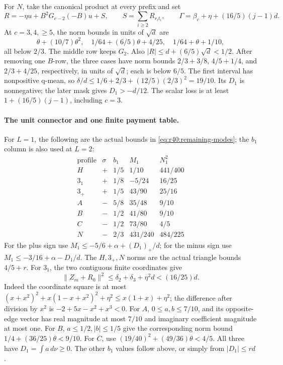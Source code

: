 For \(N\), take the canonical product at every prefix and set
\[
 R=-\eta u+B^2G_{c-2}(-B)u+S,\qquad
 S=\sum_{i\ge2}R_{r_it_i},\qquad
 \Gamma=\beta_c+\eta+(16/5)(j-1)d .
\]
At \(c=3,4,\ge5\), the norm bounds in units of \(\sqrt d\) are
\[
 \theta+(10/7)\theta^2,\quad
 1/64+(6/5)\theta+4/25,\quad
 1/64+\theta+1/10,
\]
all below \(2/3\). The middle row keeps \(G_2\).
Also \(|R|\le d+(6/5)\sqrt d<1/2\).
After removing one \(B\)-row, the three cases have norm bounds
\(2/3+3/8\), \(4/5+1/4\), and \(2/3+4/25\), respectively,
in units of \(\sqrt d\); each is below \(6/5\).
The first interval has nonpositive q-mean, so
\(\delta/d\le1/6+2/3+(12/5)(2/3)^2=19/10\).
Its \(D_1\) is nonnegative; the later mask gives \(D_1>-d/12\).
The scalar loss is at least \(1+(16/5)(j-1)\), including \(c=3\).

\paragraph{The unit connector and one finite payment table.}
For \(L=1\), the following are the actual bounds in
\eqref{eq:r40:remaining-modes}; the \(b_1\) column is also used at \(L=2\):
\[
 \begin{array}{c|c|c|c|c}
 \text{profile}&\sigma&b_1&M_1&N_1^2\\ \hline
 H&+&1/5&1/10&441/400\\
 3_1&+&1/8&-5/24&16/25\\
 3_+&+&1/5&43/90&25/16\\
 A&-&5/8&35/48&9/10\\
 B&-&1/2&41/80&9/10\\
 C&-&1/2&73/80&4/5\\
 N&-&2/3&431/240&484/225
 \end{array}
\]
For the plus sign use
\(M_1\le-5/6+\alpha+(D_1)_+/d\);
for the minus sign use
\(M_1\le-3/16+\alpha-D_1/d\).
The \(H,3_+,N\) norms are the actual triangle bounds
\(4/5+r\).
For \(3_1\), the two contiguous finite coordinates give
\[
 \|Z_m+R_0\|^2
 \le\delta_2+\delta_3+\eta^2d<(16/25)d .
\]
Indeed the coordinate square is at most
\((x+x^2)^2+x(1-x+x^2)^2+\eta^2\le x(1+x)+\eta^2\);
the difference after division by \(x^2\) is
\(-2+5x-x^2+x^3<0\).
For \(A\), \(0\le a,b\le7/10\), and its opposite-edge vector
has real magnitude at most \(7/10\) and imaginary coefficient
magnitude at most one. For \(B\), \(a\le1/2,|b|\le1/5\) give
the corresponding norm bound \(1/4+(36/25)\theta<9/10\).
For \(C\), use
\((19/40)^2+(49/36)\theta<4/5\).
All three have \(D_1=\int a\,d\nu\ge0\).
The other \(b_1\) values follow above, or simply from
\(|D_1|\le r d\).


